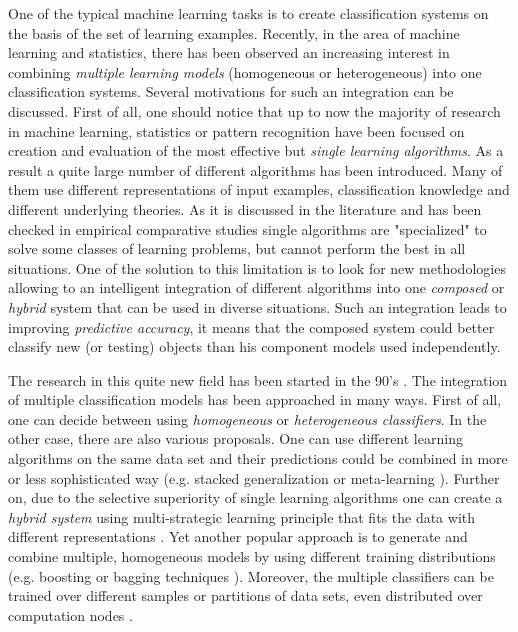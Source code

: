 \documentclass{article}
\begin{document}
One of the typical machine learning tasks is to create
classification systems on the basis of the set of learning
examples. Recently, in the area of machine learning and
statistics, there has been observed an increasing interest in
combining {\em multiple learning models} (homogeneous or
heterogeneous) into one classification systems. Several
motivations for such an integration can be discussed. First of
all, one should notice that up to now the majority of research in
machine learning, statistics or pattern recognition have been
focused on creation and evaluation of the most effective but {\it
single learning algorithms}. As a result a quite large number of
different algorithms has been introduced. Many of them use
different representations of input examples, classification
knowledge and different underlying theories. As it is discussed in
the literature and has been checked in empirical comparative
studies \cite {Mitche} single algorithms are "specialized" to
solve some classes of learning problems, but cannot perform the
best in all situations. One of the solution to this limitation is
to look for new methodologies allowing to an intelligent
integration of different algorithms into one {\em composed} or
{\em hybrid} system that can be used in diverse situations. Such
an integration leads to improving {\em predictive accuracy}, it
means that the composed system could better classify new (or
testing) objects than his component models used independently.

The research in this quite new field has been started in the 90's
\cite{Ali,Bre,CS93,HasSol,Schapire}. The integration of multiple
classification models has been approached in many ways. First of
all, one can decide between using {\em homogeneous} or {\em
heterogeneous classifiers}. In the other case, there are also
various proposals. One can use different learning algorithms on
the same data set and their predictions could be combined in more
or less sophisticated way (e.g. stacked generalization
\cite{Wolpert} or meta-learning \cite{CS93}). Further on, due to
the selective superiority of single learning algorithms one can
create a {\em hybrid system} using multi-strategic learning
principle that fits the data with different representations
\cite{MichTe}. Yet another popular approach is to generate and
combine multiple, homogeneous models by using different training
distributions (e.g. boosting or bagging techniques
\cite{Bre,Friedman}). Moreover, the multiple classifiers can be
trained over different samples or partitions of data sets, even
distributed over computation nodes \cite{CS95,Jel96}.
\end{document}
